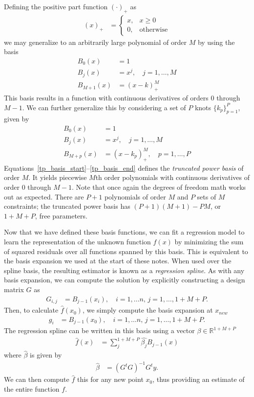 \documentclass[12pt,hidelinks]{article}
\numberwithin{equation}{section}
\begin{document}
Defining the positive part function $(\cdot)_{+}$ as
\begin{align}
(x)_{+} &= \begin{cases} x, & x \geq 0 \\ 0, & \text{otherwise} \end{cases}
\end{align}
we may generalize to an arbitrarily large polynomial of order $M$ by using
the basis
\begin{align}
B_0(x) &= 1 \\
B_j(x) &= x^j, \quad j = 1, \ldots, M \\
B_{M + 1}(x) &= (x - k)_{+}^M
\end{align}
This basis results in a function with continuous derivatives of orders
$0$ through $M-1$. We can further generalize this by considering a set
of $P$ knots $\{ k_p \}_{p = 1}^P$, given by
\begin{align}
B_0(x) &= 1 \label{tp_basis_start} \\
B_j(x) &= x^j, \quad j = 1, \ldots, M \\
B_{M + p}(x) &= (x - k_p)_{+}^M, \quad p = 1, \ldots, P \label{tp_basis_end}
\end{align}
Equations~\ref{tp_basis_start}--\ref{tp_basis_end} defines the
\textit{truncated power basis} of order $M$. 
It yields piecewise $M$th
order polynomials with continuous derivatives of order $0$ through $M-1$.
Note that once again the degrees of freedom math works out as expected.
There are $P+1$ polynomials of order $M$ and $P$ sets of $M$ constraints;
the truncated power basis has $(P+1)(M+1) - PM$, or $1+M+P$, free parameters.

Now that we have defined these basis functions, we can fit a
regression model to learn the representation of the unknown function
$f(x)$ by minimizing the sum of squared residuals over all functions
spanned by this basis. This is equivalent to the basis expansion
we used at the start of these notes. When used over the spline basis,
the resulting estimator is known as a \textit{regression spline}.
As with any basis expansion, we can compute the solution by explicitly
constructing a design matrix $G$ as
\begin{align}
G_{i,j} &= B_{j-1}(x_i), \quad i = 1, \ldots n, \, j = 1, \ldots, 1 + M + P. \label{trun_basis_g}
\end{align}
Then, to calculate $\widehat{f}(x_{0})$, we simply compute the
basis expansion at $x_{new}$
\begin{align}
g_i &= B_{j-1}(x_0), \quad i = 1, \ldots n, \, j = 1, \ldots, 1 + M + P.
\end{align}
The regression spline can be written in this basis using a
vector $\beta \in \mathbb{R}^{1 + M + P}$
\begin{align}
\widehat{f}(x) &= \sum_j^{1 + M + P} \widehat{\beta_j} B_{j - 1}(x)
\end{align}
where $\widehat{\beta}$ is given by
\begin{align}
\widehat{\beta} &= (G^t G)^{-1} G^t y.
\end{align}
We can then compute $\widehat{f}$ this for any new point $x_{0}$, thus
providing an estimate of the entire function $f$.
\end{document}
